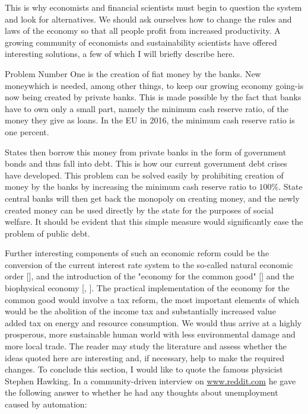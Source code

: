 \documentclass[10pt]{book}
\begin{document}
This is why economists and financial scientists must begin to question the system and look for alternatives. We should ask ourselves how to change the rules and laws of the economy so that all people profit from increased productivity. A growing community of economists and sustainability scientists have offered interesting solutions, a few of which I will briefly describe here.

Problem Number One is the creation of fiat money by the banks. New moneywhich is needed, among other things, to keep our growing economy going-is now being created by private banks. This is made possible by the fact that banks have to own only a small part, namely the minimum cash reserve ratio, of the money they give as loans. In the EU in 2016, the minimum cash reserve ratio is one percent.

States then borrow this money from private banks in the form of government bonds and thus fall into debt. This is how our current government debt crises have developed. This problem can be solved easily by prohibiting creation of money by the banks by increasing the minimum cash reserve ratio to $100 \%$. State central banks will then get back the monopoly on creating money, and the newly created money can be used directly by the state for the purposes of social welfare. It should be evident that this simple measure would significantly ease the problem of public debt.

Further interesting components of such an economic reform could be the conversion of the current interest rate system to the so-called natural economic order [\cite{gesell1958natural}], and the introduction of the "economy for the common good" [\cite{felber2014gemeinwohl}] and the biophysical economy [\cite{grahl2009loch}, \cite{kuemmel2011secondlaw}]. The practical implementation of the economy for the common good would involve a tax reform, the most important elements of which would be the abolition of the income tax and substantially increased value\\
added tax on energy and resource consumption. We would thus arrive at a highly prosperous, more sustainable human world with less environmental damage and more local trade. The reader may study the literature and assess whether the ideas quoted here are interesting and, if necessary, help to make the required changes.
To conclude this section, I would like to quote the famous physicist Stephen Hawking. In a community-driven interview on \href{http://www.reddit.com}{www.reddit.com} he gave the following answer to whether he had any thoughts about unemployment caused by automation:
\end{document}

